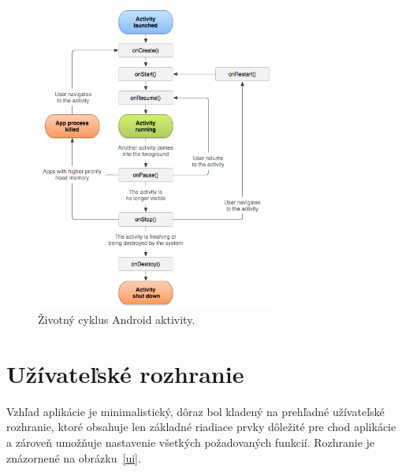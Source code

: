 \begin{figure}[!hbt]
	\centering
	\includegraphics[width=0.7\textwidth]{obrazky-figures/activity.png}
	\caption{Životný cyklus Android aktivity\protect\footnotemark.}
	\label{activity}
\end{figure}

\pagebreak

\section{Užívateľské rozhranie}

Vzhľad aplikácie je minimalistický, dôraz bol kladený na prehľadné užívateľské rozhranie, ktoré obsahuje len základné riadiace prvky dôležité pre chod aplikácie a zároveň umožňuje nastavenie všetkých požadovaných funkcií. Rozhranie je znázornené na obrázku~\ref{ui}.


